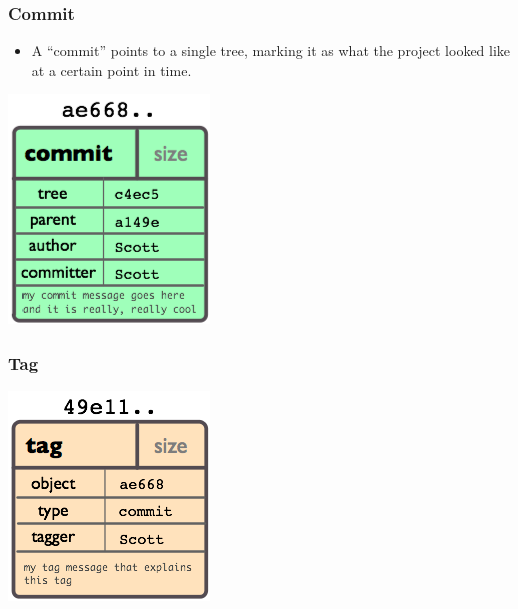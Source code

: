 \documentclass{beamer}
\begin{document}
\begin{frame}
  \frametitle{Commit}
  \begin{itemize}
    \item A ``commit'' points to a single tree, marking it as what the project looked like at a certain point in time. 
  \end{itemize}
  \includegraphics{images/object-commit.png}
\end{frame}

\begin{frame}
  \frametitle{Tag}
  \includegraphics{images/object-tag.png}
\end{frame}

\end{document}
